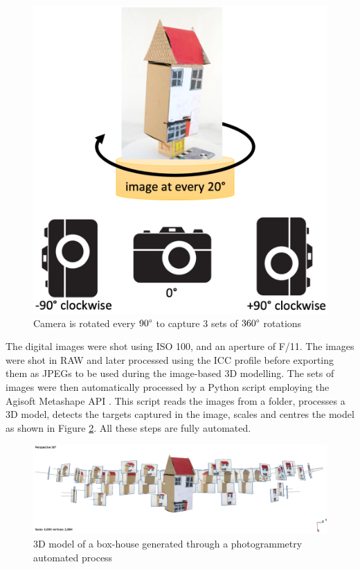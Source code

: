 \documentclass[acmlarge,screen,dvipsnames]{acmart}
\begin{document}
\begin{figure}[h]
\includegraphics[width=0.6\linewidth]{images/camerarot.png}
\caption{Camera is rotated every $90\degree$ to capture 3 sets of $360\degree$ rotations} \label{fig:camrot} 
\end{figure}

The digital images were shot using ISO 100, and an aperture of F/11. The
images were shot in RAW and later processed using the ICC profile before
exporting them as JPEGs to be used during the image-based 3D modelling. The sets of images were then automatically processed by a Python
script employing the Agisoft Metashape API \cite{Metashapesite}. This
script reads the images from a folder, processes a 3D model, detects the
targets captured in the image, scales and centres the model as shown in
Figure \ref{fig:metashape}. All these steps are fully automated.


\begin{figure}[h] \centering
\includegraphics[width=1\linewidth]{images/metashape.png} 
\caption{3D model of a box-house generated through a photogrammetry automated
process} \label{fig:metashape}  
\end{figure}
\end{document}
